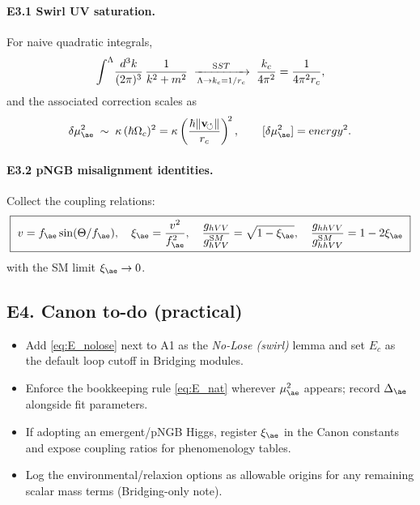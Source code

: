 \documentclass[11pt]{article}
\begin{document}
\paragraph{E3.1 Swirl UV saturation.}
For naive quadratic integrals,
\begin{equation}
\int^{\Lambda}\!\frac{d^3k}{(2\pi)^3}\,\frac{1}{k^2+m^2}
\;\xrightarrow[\Lambda\to k_c=1/r_c]{\textrm SST}\;
\frac{k_c}{4\pi^2}=\frac{1}{4\pi^2 r_c},
\end{equation}
and the associated correction scales as
\begin{equation}
\delta\mu_{\ae}^2 \;\sim\; \kappa\,(\hbar\Omega_c)^2
=\kappa\left(\frac{\hbar\|{\bf v}_{\!\circlearrowleft}\|}{r_c}\right)^{\!2},\qquad
[\delta\mu_{\ae}^2]={\textrm energy}^2.
\end{equation}

\paragraph{E3.2 pNGB misalignment identities.}
Collect the coupling relations:
\begin{equation}
\boxed{\
v=f_{\ae}\sin(\Theta/f_{\ae}),\quad
\xi_{\ae}=\frac{v^2}{f_{\ae}^2},\quad
\frac{g_{hVV}}{g_{hVV}^{\textrm SM}}=\sqrt{1-\xi_{\ae}},\quad
\frac{g_{hhVV}}{g_{hhVV}^{\textrm SM}}=1-2\xi_{\ae}\
}
\end{equation}
with the SM limit $\xi_{\ae}\to0$.

\subsection*{E4. Canon to-do (practical)}
\begin{itemize}
\item Add \eqref{eq:E_nolose} next to A1 as the \emph{No-Lose (swirl)} lemma and set $E_c$ as the default loop cutoff in Bridging modules.
\item Enforce the bookkeeping rule \eqref{eq:E_nat} wherever $\mu_{\ae}^2$ appears; record $\Delta_{\ae}$ alongside fit parameters.
\item If adopting an emergent/pNGB Higgs, register $\xi_{\ae}$ in the Canon constants and expose coupling ratios for phenomenology tables.
\item Log the environmental/relaxion options as allowable origins for any remaining scalar mass terms (Bridging-only note).
\end{itemize}
\end{document}
